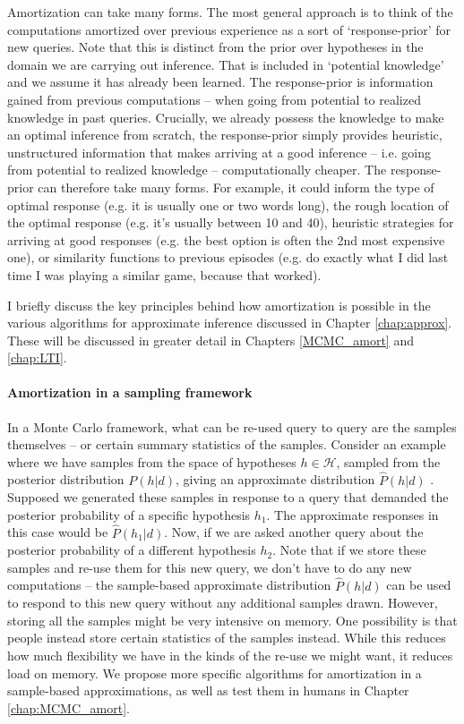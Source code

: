Amortization can take many forms. The most general approach is to think of the computations amortized over previous experience as a sort of `response-prior' for new queries. Note that this is distinct from the prior over hypotheses in the domain we are carrying out inference. That is included in `potential knowledge' and we assume it has already been learned. The response-prior is information gained from previous computations -- when going from potential to realized knowledge in past queries. Crucially, we already possess the knowledge to make an optimal inference from scratch, the response-prior simply provides heuristic, unstructured information that makes arriving at a good inference -- i.e. going from potential to realized knowledge -- computationally cheaper. The response-prior can therefore take many forms. For example, it could inform the type of optimal response (e.g. it is usually one or two words long), the rough location of the optimal response (e.g. it's usually between 10 and 40), heuristic strategies for arriving at good responses (e.g. the best option is often the 2nd most expensive one), or similarity functions to previous episodes (e.g. do exactly what I did last time I was playing a similar game, because that worked). 

I briefly discuss the key principles behind how amortization is possible in the various algorithms for approximate inference discussed in Chapter \ref{chap:approx}. These will be discussed in greater detail in Chapters \ref{MCMC_amort} and \ref{chap:LTI}.

\paragraph{Amortization in a sampling framework} 

In a Monte Carlo framework, what can be re-used query to query are the samples themselves -- or certain summary statistics of the samples. Consider an example where we have samples from the space of hypotheses $h \in \mathcal{H}$, sampled from the posterior distribution $P(h | d)$, giving an approximate distribution $\hat{P}(h | d)$ . Supposed we generated these samples in response to a query that demanded the posterior probability of a specific hypothesis $h_1$. The approximate responses in this case would be $\hat{P}(h_1 |d)$. Now, if we are asked another query about the posterior probability of a different hypothesis $h_2$. Note that if we store these samples and re-use them for this new query, we don't have to do any new computations -- the sample-based approximate distribution $\hat{P}(h | d)$ can be used to respond to this new query without any additional samples drawn. However, storing all the samples might be very intensive on memory. One possibility is that people instead store certain statistics of the samples instead. While this reduces how much flexibility we have in the kinds of the re-use we might want, it reduces load on memory. We propose more specific algorithms for amortization in a sample-based approximations, as well as test them in humans in Chapter \ref{chap:MCMC_amort}.


